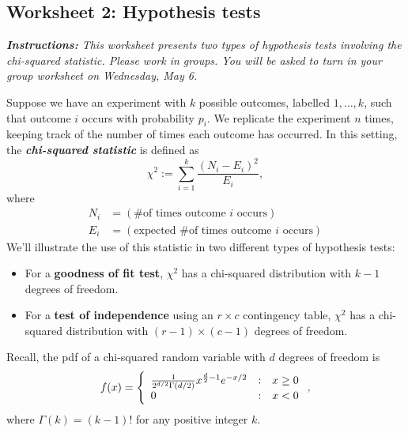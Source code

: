 \documentclass[10pt]{amsart}
\theoremstyle{definition}
\newcommand{\1}[1]{\textbf{1}_{\left[#1\right]}} %
\newcommand{\dempfcolor}[1]{{\color{RoyalBlue}#1}}
\newcommand{\demph}[1]{\dempfcolor{\textbf{\textit{#1}}}}
\begin{document}
\begin{center}
  \section*{Worksheet 2: Hypothesis tests}
\end{center}

\textit{\textbf{Instructions:} This worksheet presents two types of hypothesis
  tests involving the chi-squared statistic. Please work in groups. You will
  be asked to turn in your group worksheet on Wednesday, May 6.}



\phantom{don't write in starlight, cause the words may come out real}
\begin{center}
  {\small\begin{tcolorbox}[ width=1\textwidth, colback=white, colframe=black,
      title=Background on chi-squared statistic, colbacktitle=blue!15,
      coltitle=black ] Suppose we have an experiment with $k$ possible
      outcomes, labelled $1,\ldots,k$, such that outcome $i$ occurs with
      probability $p_{i}$. We replicate the experiment $n$ times, keeping
      track of the number of times each outcome has occurred. In this setting,
      the \demph{chi-squared statistic} is defined as
    \begin{equation*}
      \chi^{2}:= \sum_{i=1}^{k} \frac{\left(N_{i}-E_{i}\right)^{2}}{E_{i}},
    \end{equation*}
    where
    \begin{align*}
      N_{i}&= (\text{\# of times outcome $i$ occurs})\\
      E_{i} &= (\text{expected \# of times outcome $i$ occurs})
    \end{align*}
    We'll illustrate the use of this statistic in two different types of
    hypothesis tests:
    \begin{itemize}
      \item For a \textbf{goodness of fit test}, $\chi^{2}$ has a chi-squared
      distribution with $k-1$ degrees of freedom.
      \item For a \textbf{test of independence} using an $r\times c$
      contingency table, $\chi^{2}$ has a chi-squared distribution with
      $(r-1)\times(c-1)$ degrees of freedom.
    \end{itemize}

    Recall, the pdf of a chi-squared random variable with $d$ degrees of
    freedom is
    \begin{equation*}
      f(x) = \left\{ \begin{array}{l@{\quad:\quad}l} \frac{1}{2^{d/2}\Gamma(d/2)}x^{\frac{d}{2}-1}e^{-x/2} & x \geq 0\\ 0& x<0\end{array}\right.,
    \end{equation*}
    where $\Gamma(k)=(k-1)!$ for any positive integer $k$.
  \end{tcolorbox}}
\end{center}
\end{document}
